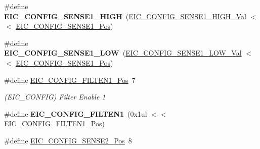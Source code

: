 \begin{DoxyCompactItemize}
\item 
\hypertarget{group___s_a_m_l21___e_i_c_gaf4366f6ade99ae499566669c526842c2}{}\#define {\bfseries E\+I\+C\+\_\+\+C\+O\+N\+F\+I\+G\+\_\+\+S\+E\+N\+S\+E1\+\_\+\+H\+I\+G\+H}~(\hyperlink{group___s_a_m_l21___e_i_c_gad9d6fe0929c266f663d7fb7b05296098}{E\+I\+C\+\_\+\+C\+O\+N\+F\+I\+G\+\_\+\+S\+E\+N\+S\+E1\+\_\+\+H\+I\+G\+H\+\_\+\+Val}    $<$$<$ \hyperlink{group___s_a_m_l21___e_i_c_gab34794f88d0b20fa2792afe7fecd7fc1}{E\+I\+C\+\_\+\+C\+O\+N\+F\+I\+G\+\_\+\+S\+E\+N\+S\+E1\+\_\+\+Pos})\label{group___s_a_m_l21___e_i_c_gaf4366f6ade99ae499566669c526842c2}

\item 
\hypertarget{group___s_a_m_l21___e_i_c_ga41a9cb9e978d4cbfccd4673a6afd500c}{}\#define {\bfseries E\+I\+C\+\_\+\+C\+O\+N\+F\+I\+G\+\_\+\+S\+E\+N\+S\+E1\+\_\+\+L\+O\+W}~(\hyperlink{group___s_a_m_l21___e_i_c_gaece415d353240e8ee175072f6a5224cd}{E\+I\+C\+\_\+\+C\+O\+N\+F\+I\+G\+\_\+\+S\+E\+N\+S\+E1\+\_\+\+L\+O\+W\+\_\+\+Val}     $<$$<$ \hyperlink{group___s_a_m_l21___e_i_c_gab34794f88d0b20fa2792afe7fecd7fc1}{E\+I\+C\+\_\+\+C\+O\+N\+F\+I\+G\+\_\+\+S\+E\+N\+S\+E1\+\_\+\+Pos})\label{group___s_a_m_l21___e_i_c_ga41a9cb9e978d4cbfccd4673a6afd500c}

\item 
\hypertarget{group___s_a_m_l21___e_i_c_ga930f7f68f458eb61711fcad9b7b0e33d}{}\#define \hyperlink{group___s_a_m_l21___e_i_c_ga930f7f68f458eb61711fcad9b7b0e33d}{E\+I\+C\+\_\+\+C\+O\+N\+F\+I\+G\+\_\+\+F\+I\+L\+T\+E\+N1\+\_\+\+Pos}~7\label{group___s_a_m_l21___e_i_c_ga930f7f68f458eb61711fcad9b7b0e33d}

\begin{DoxyCompactList}\small\item\em (E\+I\+C\+\_\+\+C\+O\+N\+F\+I\+G) Filter Enable 1 \end{DoxyCompactList}\item 
\hypertarget{group___s_a_m_l21___e_i_c_gaed447b99e55e694beb50f9d65de606c3}{}\#define {\bfseries E\+I\+C\+\_\+\+C\+O\+N\+F\+I\+G\+\_\+\+F\+I\+L\+T\+E\+N1}~(0x1ul $<$$<$ E\+I\+C\+\_\+\+C\+O\+N\+F\+I\+G\+\_\+\+F\+I\+L\+T\+E\+N1\+\_\+\+Pos)\label{group___s_a_m_l21___e_i_c_gaed447b99e55e694beb50f9d65de606c3}

\item 
\hypertarget{group___s_a_m_l21___e_i_c_gaf67e9a2938eae7c6f9f4d19c405e243f}{}\#define \hyperlink{group___s_a_m_l21___e_i_c_gaf67e9a2938eae7c6f9f4d19c405e243f}{E\+I\+C\+\_\+\+C\+O\+N\+F\+I\+G\+\_\+\+S\+E\+N\+S\+E2\+\_\+\+Pos}~8\label{group___s_a_m_l21___e_i_c_gaf67e9a2938eae7c6f9f4d19c405e243f}


\end{DoxyCompactItemize}
